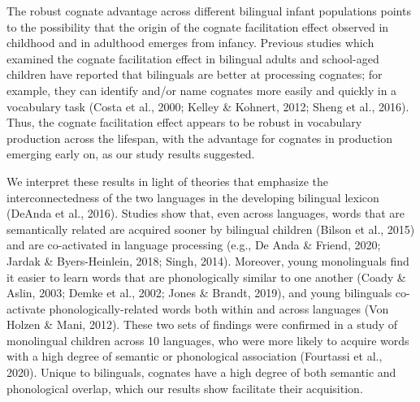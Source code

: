 \documentclass[
  english,
  ,man,floatsintext]{apa6}
\begin{document}
The robust cognate advantage across different bilingual infant populations points to the possibility that the origin of the cognate facilitation effect observed in childhood and in adulthood emerges from infancy. Previous studies which examined the cognate facilitation effect in bilingual adults and school-aged children have reported that bilinguals are better at processing cognates; for example, they can identify and/or name cognates more easily and quickly in a vocabulary task (Costa et al., 2000; Kelley \& Kohnert, 2012; Sheng et al., 2016). Thus, the cognate facilitation effect appears to be robust in vocabulary production across the lifespan, with the advantage for cognates in production emerging early on, as our study results suggested.

We interpret these results in light of theories that emphasize the interconnectedness of the two languages in the developing bilingual lexicon (DeAnda et al., 2016). Studies show that, even across languages, words that are semantically related are acquired sooner by bilingual children (Bilson et al., 2015) and are co-activated in language processing (e.g., De Anda \& Friend, 2020; Jardak \& Byers-Heinlein, 2018; Singh, 2014). Moreover, young monolinguals find it easier to learn words that are phonologically similar to one another (Coady \& Aslin, 2003; Demke et al., 2002; Jones \& Brandt, 2019), and young bilinguals co-activate phonologically-related words both within and across languages (Von Holzen \& Mani, 2012). These two sets of findings were confirmed in a study of monolingual children across 10 languages, who were more likely to acquire words with a high degree of semantic or phonological association (Fourtassi et al., 2020). Unique to bilinguals, cognates have a high degree of both semantic and phonological overlap, which our results show facilitate their acquisition.
\end{document}
